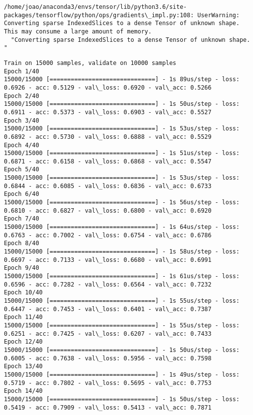 \documentclass[11pt]{article}
\begin{document}
    \begin{Verbatim}[commandchars=\\\{\}]
/home/joao/anaconda3/envs/tensor/lib/python3.6/site-packages/tensorflow/python/ops/gradients\_impl.py:108: UserWarning: Converting sparse IndexedSlices to a dense Tensor of unknown shape. This may consume a large amount of memory.
  "Converting sparse IndexedSlices to a dense Tensor of unknown shape. "

    \end{Verbatim}

    \begin{Verbatim}[commandchars=\\\{\}]
Train on 15000 samples, validate on 10000 samples
Epoch 1/40
15000/15000 [==============================] - 1s 89us/step - loss: 0.6926 - acc: 0.5129 - val\_loss: 0.6920 - val\_acc: 0.5266
Epoch 2/40
15000/15000 [==============================] - 1s 50us/step - loss: 0.6911 - acc: 0.5373 - val\_loss: 0.6903 - val\_acc: 0.5527
Epoch 3/40
15000/15000 [==============================] - 1s 53us/step - loss: 0.6892 - acc: 0.5730 - val\_loss: 0.6888 - val\_acc: 0.5529
Epoch 4/40
15000/15000 [==============================] - 1s 51us/step - loss: 0.6871 - acc: 0.6158 - val\_loss: 0.6868 - val\_acc: 0.5547
Epoch 5/40
15000/15000 [==============================] - 1s 53us/step - loss: 0.6844 - acc: 0.6085 - val\_loss: 0.6836 - val\_acc: 0.6733
Epoch 6/40
15000/15000 [==============================] - 1s 56us/step - loss: 0.6810 - acc: 0.6827 - val\_loss: 0.6800 - val\_acc: 0.6920
Epoch 7/40
15000/15000 [==============================] - 1s 64us/step - loss: 0.6763 - acc: 0.7002 - val\_loss: 0.6754 - val\_acc: 0.6786
Epoch 8/40
15000/15000 [==============================] - 1s 58us/step - loss: 0.6697 - acc: 0.7133 - val\_loss: 0.6680 - val\_acc: 0.6991
Epoch 9/40
15000/15000 [==============================] - 1s 61us/step - loss: 0.6596 - acc: 0.7282 - val\_loss: 0.6564 - val\_acc: 0.7232
Epoch 10/40
15000/15000 [==============================] - 1s 55us/step - loss: 0.6447 - acc: 0.7453 - val\_loss: 0.6401 - val\_acc: 0.7387
Epoch 11/40
15000/15000 [==============================] - 1s 55us/step - loss: 0.6251 - acc: 0.7425 - val\_loss: 0.6207 - val\_acc: 0.7433
Epoch 12/40
15000/15000 [==============================] - 1s 50us/step - loss: 0.6005 - acc: 0.7638 - val\_loss: 0.5956 - val\_acc: 0.7598
Epoch 13/40
15000/15000 [==============================] - 1s 49us/step - loss: 0.5719 - acc: 0.7802 - val\_loss: 0.5695 - val\_acc: 0.7753
Epoch 14/40
15000/15000 [==============================] - 1s 50us/step - loss: 0.5419 - acc: 0.7909 - val\_loss: 0.5413 - val\_acc: 0.7871

\end{Verbatim}
\end{document}
